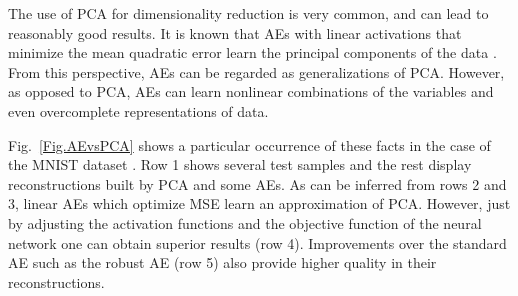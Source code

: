 \documentclass[preprint,5p,compress]{elsarticle}
\begin{document}
The use of PCA for dimensionality reduction is very common, and can lead to reasonably good results. It is known that AEs with linear activations that minimize the mean quadratic error learn the principal components of the data \cite{ANNsPCA}. From this perspective, AEs can be regarded as generalizations of PCA. However, as opposed to PCA, AEs can learn nonlinear combinations of the variables and even overcomplete representations of data.

Fig.~\ref{Fig.AEvsPCA} shows a particular occurrence of these facts in the case of the MNIST dataset \cite{MNIST}. Row 1 shows several test samples and the rest display reconstructions built by PCA and some AEs. As can be inferred from rows 2 and 3, linear AEs which optimize MSE learn an approximation of PCA. However, just by adjusting the activation functions and the objective function of the neural network one can obtain superior results (row 4). Improvements over the standard AE such as the robust AE (row 5) also provide higher quality in their reconstructions.
\end{document}
